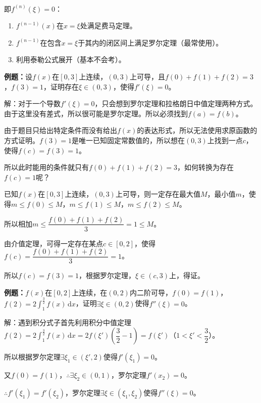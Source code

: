 \paragraph{} \leavevmode \medskip

即$f^{(n)}(\xi)=0$：

\begin{enumerate}
    \item $f^{(n-1)}(x)$在$x=\xi$处满足费马定理。
    \item $f^{(n-1)}$在包含$x=\xi$于其内的闭区间上满足罗尔定理（最常使用）。
    \item 利用泰勒公式展开（基本不会考）。
\end{enumerate}

\textbf{例题：}设$f(x)$在$[0,3]$上连续，$(0,3)$上可导，且$f(0)+f(1)+f(2)=3$，$f(3)=1$，证明存在$\xi\in(0,3)$，使得$f'(\xi)=0$。

解：对于一个导数$f'(\xi)=0$，只会想到罗尔定理和拉格朗日中值定理两种方式。由于这里没有差式，所以很可能是罗尔定理。所以必须找到$f(a)=f(b)$。

由于题目只给出特定条件而没有给出$f(x)$的表达形式，所以无法使用求原函数的方式证明。$f(3)=1$是唯一已知固定常数值的，所以想在$(0,3)$上找到一点$c$，使得$f(c)=f(3)=1$。

所以此时能用的条件就只有$f(0)+f(1)+f(2)=3$，如何转换为存在$f(c)=1$呢？

已知$f(x)$在$[0,3]$上连续，$(0,3)$上可导，则一定存在最大值$M$，最小值$m$，使得$m\leqslant f(0)\leqslant M$，$m\leqslant f(1)\leqslant M$，$m\leqslant f(2)\leqslant M$。\medskip

所以相加$m\leqslant\dfrac{f(0)+f(1)+f(2)}{3}=1\leqslant M$。

由介值定理，可得一定存在某点$c\in[0,2]$，使得$f(c)=\dfrac{f(0)+f(1)+f(2)}{3}=1$。

所以$f(c)=f(3)=1$，根据罗尔定理，$\xi\in(c,3)$上，得证。

\textbf{例题：}$f(x)$在$[0,2]$上连续，在$(0,2)$内二阶可导，$f(0)=f(1)$，$f(2)=2\int_1^{\frac{3}{2}}f(x)\,\textrm{d}x$，证明$\exists\xi\in(0,2)$使得$f''(\xi)=0$。

解：遇到积分式子首先利用积分中值定理$f(2)=2\int_1^{\frac{3}{2}}f(x)\,\textrm{d}x=2f(\xi')(\dfrac{3}{2}-1)=f(\xi')$（$1<\xi'<\dfrac{3}{2}$）。

所以根据罗尔定理$\exists\xi_1\in(\xi',2)$使得$f'(\xi_1)=0$。

又$f(0)=f(1)$，$\therefore\exists\xi_2\in(0,1)$，罗尔定理$f'(x_2)=0$。

$\therefore f'(\xi_1)=f'(\xi_2)$，罗尔定理$\exists\xi\in(\xi_1,\xi_2)$使得$f''(\xi)=0$。

